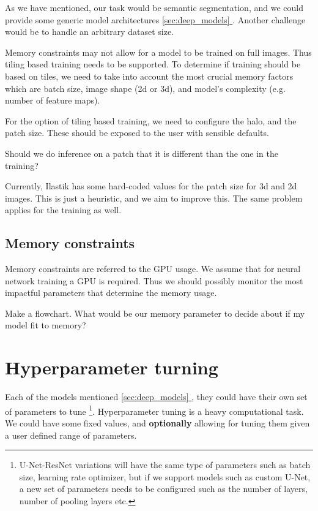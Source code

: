 \documentclass[12pt, a4paper]{article}
\newcommand*{\fullref}[1]{\hyperref[{#1}]{\ref*{#1} \nameref*{#1}}}
\begin{document}
As we have mentioned, our task would be semantic segmentation, and we could provide some generic model architectures \fullref{sec:deep_models}. Another challenge would be to handle an arbitrary dataset size.

Memory constraints may not allow for a model to be trained on full images. Thus tiling based training needs to be supported. To determine if training should be based on tiles, we need to take into account the most crucial memory factors which are batch size, image shape (2d or 3d), and model's complexity (e.g. number of feature maps).

For the option of tiling based training, we need to configure the halo, and the patch size. These should be exposed to the user with sensible defaults.

Should we do inference on a patch that it is different than the one in the training?

Currently, Ilastik has some hard-coded values for the patch size for 3d and 2d images. This is just a heuristic, and we aim to improve this. The same problem applies for the training as well.

\subsection{Memory constraints}

Memory constraints are referred to the GPU usage. We assume that for neural network training a GPU is required. Thus we should possibly monitor the most impactful parameters that determine the memory usage.

Make a flowchart. What would be our memory parameter to decide about if my model fit to memory?

\section{Hyperparameter turning}

Each of the models mentioned \fullref{sec:deep_models}, they could have their own set of parameters to tune \footnote{U-Net-ResNet variations will have the same type of parameters such as batch size, learning rate optimizer, but if we support models such as custom U-Net, a new set of parameters needs to be configured such as the number of layers, number of pooling layers etc.}. Hyperparameter tuning is a heavy computational task. We could have some fixed values, and \textbf{optionally} allowing for tuning them given a user defined range of parameters.
\end{document}
